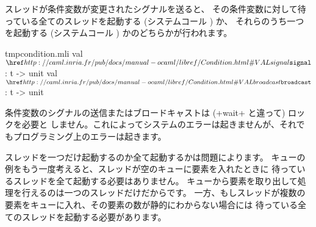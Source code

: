 スレッドが条件変数が変更されたシグナルを送ると、
その条件変数に対して待っている全てのスレッドを起動する (システムコール ) か、
それらのうち一つを起動する (システムコール ) かのどちらかが行われます。
%
\begin{listingcodefile}{tmpcondition.mli}
val $\libvalue{Condition}{signal}$ : t -> unit
val $\libvalue{Condition}{broadcast}$ : t -> unit
\end{listingcodefile}
%
条件変数のシグナルの送信またはブロードキャストは (\ml+wait+ と違って) ロックを必要と
しません。これによってシステムのエラーは起きませんが、それでもプログラミング上のエラーは起きます。

スレッドを一つだけ起動するのか全て起動するかは問題によります。
キューの例をもう一度考えると、スレッドが空のキューに要素を入れたときに
待っているスレッドを全て起動する必要はありません。
キューから要素を取り出して処理を行えるのは一つのスレッドだけだからです。
一方、もしスレッドが複数の要素をキューに入れ、その要素の数が静的にわからない場合には
待っている全てのスレッドを起動する必要があります。

